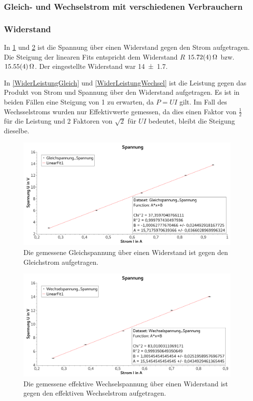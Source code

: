 \documentclass[
	a4paper,
	12pt,
	pagesize,
	ngerman
]{scrartcl}
\begin{document}
	\subsubsection{Gleich- und Wechselstrom mit verschiedenen Verbrauchern}
	\subsubsection*{Widerstand}
	In \cref{WiderSpannungGleich} und \cref{WiderSpannungWechsel} ist die Spannung über einen Widerstand gegen den Strom aufgetragen. 
	Die Steigung der linearen Fits entspricht dem Widerstand $R$ $\SI{15,72 \pm 0,04}{\Omega}$ bzw. $\SI{15,55 \pm 0,04}{\Omega}$. 
	Der eingestellte Widerstand war \SI{14 \pm 1,7}{\Omega}.

	In \cref{WiderLeistungGleich} und \cref{WiderLeistungWechsel} ist die Leistung gegen das Produkt von Strom und Spannung über den Widerstand aufgetragen. Es ist in beiden Fällen eine Steigung von 1 zu erwarten, da $P = UI$ gilt. Im Fall des Wechsselstroms wurden nur Effektivwerte gemessen, da dies einen Faktor von $\frac{1}{2}$ für die Leistung und 2 Faktoren von $\sqrt{2}$ für $UI$ bedeutet, bleibt die Steigung dieselbe.
	\begin{figure}[tb]
		\includegraphics[width=1\textwidth]{WiderSpannungGleich}
		\centering
		\caption{Die gemessene Gleichspannung über einen Widerstand ist gegen den Gleichstrom aufgetragen.}
		\label{WiderSpannungGleich}
		\centering
	\end{figure}
	\begin{figure}[tb]
		\includegraphics[width=1\textwidth]{WiderSpannungWechsel}
		\centering
		\caption{Die gemessene effektive Wechselspannung über einen Widerstand ist gegen den effektiven Wechselstrom aufgetragen.}
		\label{WiderSpannungWechsel}
		\centering
	\end{figure}
\end{document}
